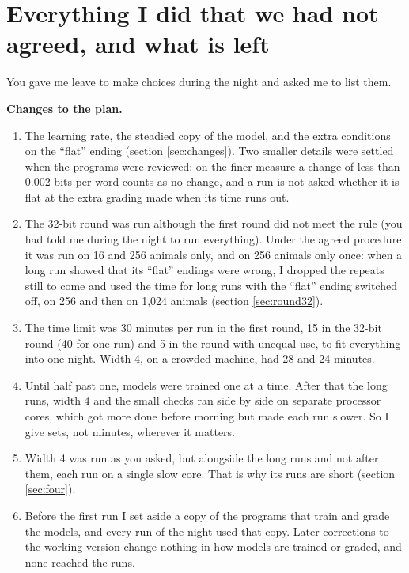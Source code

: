 \section{Everything I did that we had not agreed, and what is left}\label{sec:extras}

You gave me leave to make choices during the night and asked me to list them.

\textbf{Changes to the plan.}
\begin{enumerate}
\item The learning rate, the steadied copy of the model, and the extra conditions on the
      ``flat'' ending (section \ref{sec:changes}). Two smaller details were settled when the
      programs were reviewed: on the finer measure a change of less than 0.002 bits per word
      counts as no change, and a run is not asked whether it is flat at the extra grading made
      when its time runs out.
\item The 32-bit round was run although the first round did not meet the rule (you had told
      me during the night to run everything). Under the
      agreed procedure it was run on 16 and 256 animals only, and on 256 animals only once:
      when a long run showed that its ``flat'' endings were wrong, I dropped the repeats still
      to come and used the time for long runs with the ``flat'' ending switched off, on 256
      and then on 1,024 animals (section \ref{sec:round32}).
\item The time limit was 30 minutes per run in the first round, 15 in the 32-bit round (40 for
      one run) and 5 in the round with unequal use, to fit everything into one night. Width 4,
      on a crowded machine, had 28 and 24 minutes.
\item Until half past one, models were trained one at a time. After that the long runs,
      width 4 and the small checks ran side by side on separate processor cores, which got
      more done before morning but made each run slower. So I give sets, not minutes,
      wherever it matters.
\item Width 4 was run as you asked, but alongside the long runs and not after them, each run
      on a single slow core. That is why its runs are short (section \ref{sec:four}).
\item Before the first run I set aside a copy of the programs that train and grade the
      models, and every run of the night used that copy. Later corrections to the working
      version change nothing in how models are trained or graded, and none reached the runs.
\end{enumerate}

